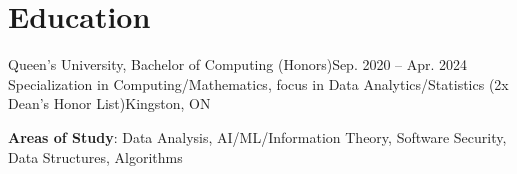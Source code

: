 \section{Education}
  \resumeSubHeadingListStart
    \resumeSubheading
      {Queen's University, Bachelor of Computing (Honors)}{Sep. 2020 -- Apr. 2024}
      {Specialization in Computing/Mathematics, focus in Data Analytics/Statistics (2x Dean's Honor List)}{Kingston, ON}
      \begin{itemize}[leftmargin=0.0in, label={}]
    \small{\item{
     \textbf{Areas of Study}{: Data Analysis, AI/ML/Information Theory, Software Security, Data Structures, Algorithms}
    }}
 \end{itemize}
  \resumeSubHeadingListEnd